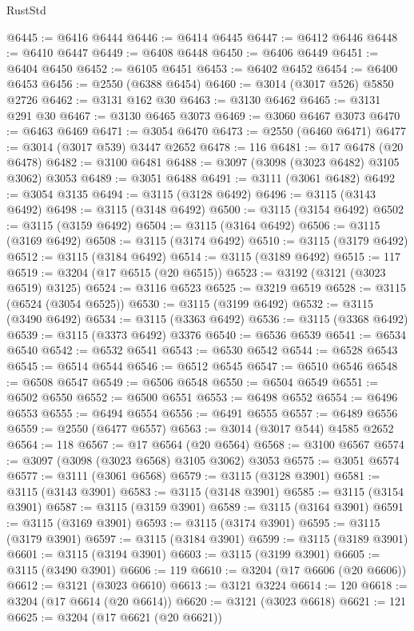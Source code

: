 \begin{lexlean}{RustStd}
\begin{coremodule}
{\begin{coremodule}
{{{{{{{{{{{{{{{{{{{{{{{{{{{{{{{{@6445 := @6416 @6444
@6446 := @6414 @6445
@6447 := @6412 @6446
@6448 := @6410 @6447
@6449 := @6408 @6448
@6450 := @6406 @6449
@6451 := @6404 @6450
@6452 := @6105 @6451
@6453 := @6402 @6452
@6454 := @6400 @6453
@6456 := @2550 (@6388 @6454)
@6460 := @3014 (@3017 @526) @5850 @2726
@6462 := @3131 @162 @30
@6463 := @3130 @6462
@6465 := @3131 @291 @30
@6467 := @3130 @6465 @3073
@6469 := @3060 @6467 @3073
@6470 := @6463 @6469
@6471 := @3054 @6470
@6473 := @2550 (@6460 @6471)
@6477 := @3014 (@3017 @539) @3447 @2652
@6478 := 116
@6481 := @17 @6478 (@20 @6478)
@6482 := @3100 @6481
@6488 := @3097 (@3098 (@3023 @6482) @3105 @3062) @3053
@6489 := @3051 @6488
@6491 := @3111 (@3061 @6482)
@6492 := @3054 @3135
@6494 := @3115 (@3128 @6492)
@6496 := @3115 (@3143 @6492)
@6498 := @3115 (@3148 @6492)
@6500 := @3115 (@3154 @6492)
@6502 := @3115 (@3159 @6492)
@6504 := @3115 (@3164 @6492)
@6506 := @3115 (@3169 @6492)
@6508 := @3115 (@3174 @6492)
@6510 := @3115 (@3179 @6492)
@6512 := @3115 (@3184 @6492)
@6514 := @3115 (@3189 @6492)
@6515 := 117
@6519 := @3204 (@17 @6515 (@20 @6515))
@6523 := @3192 (@3121 (@3023 @6519) @3125)
@6524 := @3116 @6523
@6525 := @3219 @6519
@6528 := @3115 (@6524 (@3054 @6525))
@6530 := @3115 (@3199 @6492)
@6532 := @3115 (@3490 @6492)
@6534 := @3115 (@3363 @6492)
@6536 := @3115 (@3368 @6492)
@6539 := @3115 (@3373 @6492) @3376
@6540 := @6536 @6539
@6541 := @6534 @6540
@6542 := @6532 @6541
@6543 := @6530 @6542
@6544 := @6528 @6543
@6545 := @6514 @6544
@6546 := @6512 @6545
@6547 := @6510 @6546
@6548 := @6508 @6547
@6549 := @6506 @6548
@6550 := @6504 @6549
@6551 := @6502 @6550
@6552 := @6500 @6551
@6553 := @6498 @6552
@6554 := @6496 @6553
@6555 := @6494 @6554
@6556 := @6491 @6555
@6557 := @6489 @6556
@6559 := @2550 (@6477 @6557)
@6563 := @3014 (@3017 @544) @4585 @2652
@6564 := 118
@6567 := @17 @6564 (@20 @6564)
@6568 := @3100 @6567
@6574 := @3097 (@3098 (@3023 @6568) @3105 @3062) @3053
@6575 := @3051 @6574
@6577 := @3111 (@3061 @6568)
@6579 := @3115 (@3128 @3901)
@6581 := @3115 (@3143 @3901)
@6583 := @3115 (@3148 @3901)
@6585 := @3115 (@3154 @3901)
@6587 := @3115 (@3159 @3901)
@6589 := @3115 (@3164 @3901)
@6591 := @3115 (@3169 @3901)
@6593 := @3115 (@3174 @3901)
@6595 := @3115 (@3179 @3901)
@6597 := @3115 (@3184 @3901)
@6599 := @3115 (@3189 @3901)
@6601 := @3115 (@3194 @3901)
@6603 := @3115 (@3199 @3901)
@6605 := @3115 (@3490 @3901)
@6606 := 119
@6610 := @3204 (@17 @6606 (@20 @6606))
@6612 := @3121 (@3023 @6610)
@6613 := @3121 @3224
@6614 := 120
@6618 := @3204 (@17 @6614 (@20 @6614))
@6620 := @3121 (@3023 @6618)
@6621 := 121
@6625 := @3204 (@17 @6621 (@20 @6621))
}}}}}}}}}}}}}}}}}}}}}}}}}}}}}}}}
\end{coremodule}}
\end{coremodule}
\end{lexlean}
